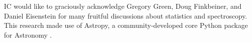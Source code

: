 \documentclass[preprint]{aastex} %
\begin{document}
\acknowledgments
IC would like to graciously acknowledge Gregory Green, Doug Finkbeiner, and Daniel Eisenstein for many fruitful discussions about statistics and spectroscopy. This research made use of Astropy, a community-developed core Python package for Astronomy \citep{art+13}.

%
%



\end{document}
